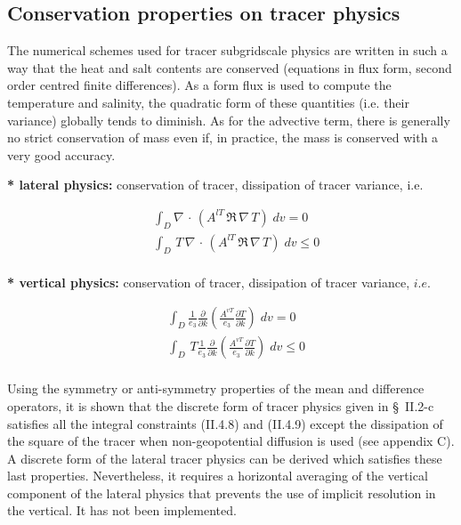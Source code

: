 \documentclass[../main/NEMO_manual]{subfiles}
\begin{document}
\subsection{Conservation properties on tracer physics}
\label{subsec:Invariant_tra_physics}

The numerical schemes used for tracer subgridscale physics are written in such a way that
the heat and salt contents are conserved (equations in flux form, second order centred finite differences).
As a form flux is used to compute the temperature and salinity,
the quadratic form of these quantities (i.e. their variance) globally tends to diminish.
As for the advective term, there is generally no strict conservation of mass even if,
in practice, the mass is conserved with a very good accuracy. 

\textbf{* lateral physics: }conservation of tracer, dissipation of tracer 
variance, i.e.

\[
  \begin{aligned}
    &\int_D \nabla\, \cdot\, \left( A^{lT} \,\Re \,\nabla \,T \right)\;dv = 0 \\
    &\int_D \,T\, \nabla\, \cdot\, \left( A^{lT} \,\Re \,\nabla \,T \right)\;dv \leq 0 \\
  \end{aligned}
\]

\textbf{* vertical physics: }conservation of tracer, dissipation of tracer variance, $i.e.$

\[
  \begin{aligned}
    & \int_D \frac{1}{e_3 } \frac{\partial }{\partial k}\left( \frac{A^{vT}}{e_3 }  \frac{\partial T}{\partial k}  \right)\;dv = 0 \\
    & \int_D \,T \frac{1}{e_3 } \frac{\partial }{\partial k}\left( \frac{A^{vT}}{e_3 }  \frac{\partial T}{\partial k}  \right)\;dv \leq 0 \\
  \end{aligned}
\]

Using the symmetry or anti-symmetry properties of the mean and difference operators,
it is shown that the discrete form of tracer physics given in {\S}~II.2-c satisfies all the integral constraints
(II.4.8) and (II.4.9) except the dissipation of the square of the tracer when non-geopotential diffusion is used
(see appendix C).
A discrete form of the lateral tracer physics can be derived which satisfies these last properties.
Nevertheless, it requires a horizontal averaging of the vertical component of the lateral physics that
prevents the use of implicit resolution in the vertical.
It has not been implemented.

\biblio
\end{document}

